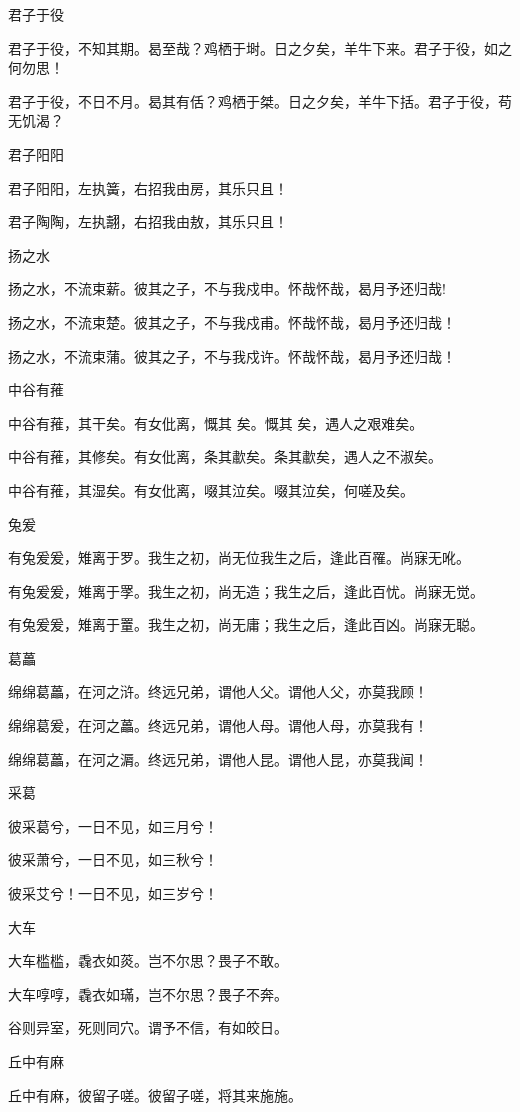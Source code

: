 君子于役

君子于役，不知其期。曷至哉？鸡栖于埘。日之夕矣，羊牛下来。君子于役，如之何勿思！

君子于役，不日不月。曷其有佸？鸡栖于桀。日之夕矣，羊牛下括。君子于役，苟无饥渴？

君子阳阳

君子阳阳，左执簧，右招我由房，其乐只且！

君子陶陶，左执翿，右招我由敖，其乐只且！

扬之水

扬之水，不流束薪。彼其之子，不与我戍申。怀哉怀哉，曷月予还归哉!

扬之水，不流束楚。彼其之子，不与我戍甫。怀哉怀哉，曷月予还归哉！

扬之水，不流束蒲。彼其之子，不与我戍许。怀哉怀哉，曷月予还归哉！

中谷有蓷

中谷有蓷，其干矣。有女仳离，慨其 矣。慨其 矣，遇人之艰难矣。

中谷有蓷，其修矣。有女仳离，条其歗矣。条其歗矣，遇人之不淑矣。

中谷有蓷，其湿矣。有女仳离，啜其泣矣。啜其泣矣，何嗟及矣。

兔爰

有兔爰爰，雉离于罗。我生之初，尚无位我生之后，逢此百罹。尚寐无吪。

有兔爰爰，雉离于罦。我生之初，尚无造；我生之后，逢此百忧。尚寐无觉。

有兔爰爰，雉离于罿。我生之初，尚无庸；我生之后，逢此百凶。尚寐无聪。

葛藟

绵绵葛藟，在河之浒。终远兄弟，谓他人父。谓他人父，亦莫我顾！

绵绵葛爰，在河之藟。终远兄弟，谓他人母。谓他人母，亦莫我有！

绵绵葛藟，在河之漘。终远兄弟，谓他人昆。谓他人昆，亦莫我闻！

采葛

彼采葛兮，一日不见，如三月兮！

彼采萧兮，一日不见，如三秋兮！

彼采艾兮！一日不见，如三岁兮！

大车

大车槛槛，毳衣如菼。岂不尔思？畏子不敢。

大车啍啍，毳衣如璊，岂不尔思？畏子不奔。

谷则异室，死则同穴。谓予不信，有如皎日。

丘中有麻

丘中有麻，彼留子嗟。彼留子嗟，将其来施施。


